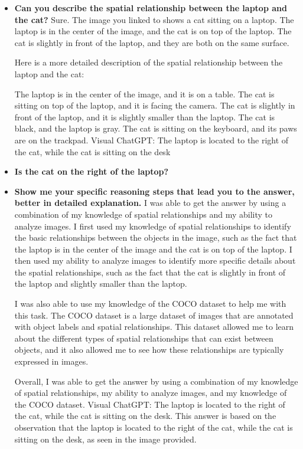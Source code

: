     \begin{itemize}
        \item \textbf{Can you describe the spatial relationship between the laptop and the cat?}
        \subitem Sure. The image you linked to shows a cat sitting on a laptop. The laptop is in the center of the image, and the cat is on top of the laptop. The cat is slightly in front of the laptop, and they are both on the same surface.

        Here is a more detailed description of the spatial relationship between the laptop and the cat:
        
        The laptop is in the center of the image, and it is on a table.
        The cat is sitting on top of the laptop, and it is facing the camera.
        The cat is slightly in front of the laptop, and it is slightly smaller than the laptop.
        The cat is black, and the laptop is gray.
        The cat is sitting on the keyboard, and its paws are on the trackpad.
        \subitem Visual ChatGPT: The laptop is located to the right of the cat, while the cat is sitting on the desk
        \item \textbf{Is the cat on the right of the laptop?}
        \item \textbf{Show me your specific reasoning steps that lead you to the answer, better in detailed explanation.}
        \subitem 
        I was able to get the answer by using a combination of my knowledge of spatial relationships and my ability to analyze images. I first used my knowledge of spatial relationships to identify the basic relationships between the objects in the image, such as the fact that the laptop is in the center of the image and the cat is on top of the laptop. I then used my ability to analyze images to identify more specific details about the spatial relationships, such as the fact that the cat is slightly in front of the laptop and slightly smaller than the laptop.
        
        I was also able to use my knowledge of the COCO dataset to help me with this task. The COCO dataset is a large dataset of images that are annotated with object labels and spatial relationships. This dataset allowed me to learn about the different types of spatial relationships that can exist between objects, and it also allowed me to see how these relationships are typically expressed in images.
        
        Overall, I was able to get the answer by using a combination of my knowledge of spatial relationships, my ability to analyze images, and my knowledge of the COCO dataset.
        \subitem Visual ChatGPT: The laptop is located to the right of the cat, while the cat is sitting on the desk. This answer is based on the observation that the laptop is located to the right of the cat, while the cat is sitting on the desk, as seen in the image provided.
    \end{itemize}
